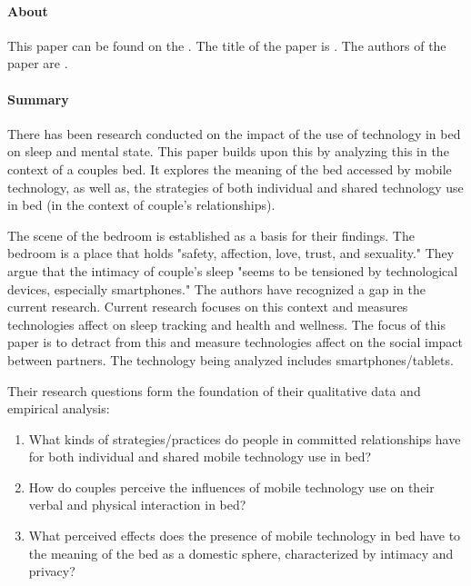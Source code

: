 \paragraph{About}
This paper can be found on the . The title of the paper is . The authors of the paper are .

\paragraph{Summary}
There has been research conducted on the impact of the use of technology in bed on sleep and mental state. This paper builds upon this by analyzing this in the context of a couples bed. It explores the meaning of the bed accessed by mobile technology, as well as, the strategies of both individual and shared technology use in bed (in the context of couple's relationships).

The scene of the bedroom is established as a basis for their findings. The bedroom is a place that holds "safety, affection, love, trust, and sexuality." They argue that the intimacy of couple's sleep "seems to be tensioned by technological devices, especially smartphones." The authors have recognized a gap in the current research. Current research focuses on this context and measures technologies affect on sleep tracking and health and wellness. The focus of this paper is to detract from this and measure technologies affect on the social impact between partners. The technology being analyzed includes smartphones/tablets.

Their research questions form the foundation of their qualitative data and empirical analysis:

\begin{enumerate}
\item
  What kinds of strategies/practices do people in committed relationships have for both individual and shared mobile technology use in bed?
\item
  How do couples perceive the influences of mobile technology use on their verbal and physical interaction in bed?
\item
  What perceived effects does the presence of mobile technology in bed have to the meaning of the bed as a domestic sphere, characterized by intimacy and privacy?
\end{enumerate}

